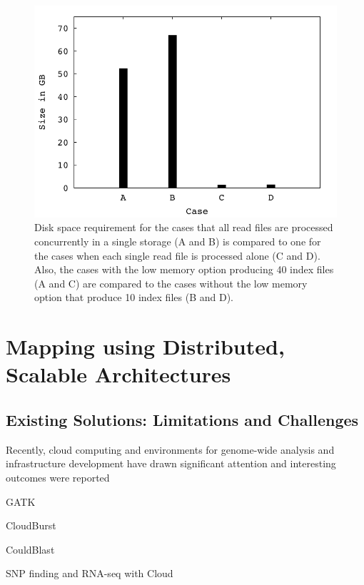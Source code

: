 \documentclass{acm_proc_article-sp}
\begin{document}
\begin{figure}
 \centering
\includegraphics[scale=0.66]{figures/diskspace.pdf}
\caption{\small Disk space requirement for the cases that all read
  files are processed concurrently in a single storage (A and B) is
  compared to one for the cases when each single read file is
  processed alone (C and D).  Also, the cases with the low memory
  option producing 40 index files (A and C) are compared to the cases
  without the low memory option that produce 10 index files (B and
  D). }
  \label{fig:diskspace} 
 \end{figure}

\section{Mapping using Distributed, Scalable Architectures}

\subsection{Existing Solutions: Limitations and Challenges}


Recently, cloud computing and environments for genome-wide analysis
and infrastructure development have drawn significant attention and
interesting outcomes were reported\cite{taylor2010,cloudburst,
  cloudblast, langmead2009, langmead2010,gatk, halligan2009}

\begin{itemize*}
\item GATK\cite{gatk}
\item CloudBurst\cite{cloudburst}
\item CouldBlast\cite{cloudblast}
\item SNP finding and RNA-seq with Cloud\cite{langmead2009, langmead2010}
\end{itemize*}
\end{document}
